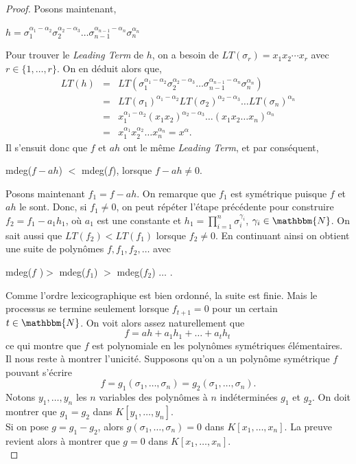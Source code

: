 \documentclass[12pt]{article}
\theoremstyle{remark}\newtheorem{note}{Note}
\theoremstyle{remark}\newtheorem{nota}{Notation}
\theoremstyle{definition}
\begin{document}
\begin{proof}
Posons maintenant,
\begin{center}
$h=\sigma_1^{\alpha_1 - \alpha_2} \sigma_2^{\alpha_2 - \alpha_3} \ldots \sigma_{n-1}^{\alpha_{n-1}-\alpha_n} \sigma_n^{\alpha_n}$
\end{center}
Pour trouver le \textit{Leading Term} de $h$, on a besoin de $LT(\sigma_r)=x_1x_2 \cdots x_r$ avec $r \in \lbrace 1, \ldots , r \rbrace$. On en déduit alors que, 
\begin{eqnarray}
LT(h) &=& LT( \sigma_1^{\alpha_1 - \alpha_2} \sigma_2^{\alpha_2 - \alpha_3} \ldots \sigma_{n-1}^{\alpha_{n-1}-\alpha_n} \sigma_n^{\alpha_n}) \nonumber \\
&=& LT(\sigma_1)^{\alpha_1 - \alpha_2}LT(\sigma_2)^{\alpha_2 - \alpha_3} \ldots LT(\sigma_n)^{\alpha_n} \nonumber \\
&=& x_1^{\alpha_1 - \alpha_2}(x_1x_2)^{\alpha_2 - \alpha_3} \ldots (x_1x_2 \ldots x_n)^{\alpha_n} \nonumber \\ 
&=& x_1^{\alpha_1}x_2^{\alpha_2} \ldots x_n^{\alpha_n} = x^\alpha . \nonumber
\end{eqnarray}
Il s'ensuit donc que $f$ et $ah$ ont le même \textit{Leading Term}, et par conséquent,
\begin{center}
mdeg($f-ah$) $<$ mdeg($f$), lorsque $f-ah \neq 0$.
\end{center}
\vspace{12pt}Posons maintenant $f_1 = f - ah$. On remarque que $f_1$ est symétrique puisque $f$ et $ah$ le sont. Donc, si $f_1 \neq 0$, on peut répéter l'étape précédente pour construire $f_2 = f_1 - a_1h_1$, où $a_1$ est une constante et $h_1 = \displaystyle \prod_{i=1}^{n} \sigma_i^{\gamma_i}$, $\gamma_i \in \mathbbm{N}$. On sait aussi que $LT(f_2)<LT(f_1)$ lorsque $f_2 \neq 0$. En continuant ainsi on obtient une suite de polynômes $f, f_1, f_2, \ldots$ avec
\begin{center}
mdeg($f$ )$>$ mdeg($f_1$) $>$ mdeg($f_2$) $\ldots$ .
\end{center}
Comme l'ordre lexicographique est bien ordonné, la suite est finie. Mais le processus se termine seulement lorsque $f_{t+1}=0$ pour un certain $t \in \mathbbm{N}$. On voit alors assez naturellement que 
$$f = ah + a_1h_1 + \ldots + a_th_t\,$$
ce qui montre que $f$ est polynomiale en les polynômes symétriques élémentaires.
\\

Il nous reste à montrer l'unicité. Supposons qu'on a un polynôme symétrique $f$ pouvant s'écrire
$$f=g_1(\sigma_1, \ldots , \sigma_n) = g_2(\sigma_1, \ldots , \sigma_n).$$
Notons $y_1, \ldots , y_n$ les $n$ variables des polynômes à $n$ indéterminées $g_1$ et $g_2$. On doit montrer que $g_1 = g_2$ dans $K \left[  y_1, \ldots , y_n \right] $.\\
Si on pose $g = g_1 - g_2$, alors $g(\sigma_1 , \ldots , \sigma_n) = 0$ dans $K \left[ x_1, \ldots , x_n \right] $. La preuve revient alors à montrer que $g=0$ dans $K \left[ x_1, \ldots , x_n \right]$.\\


\end{proof}
\end{document}
